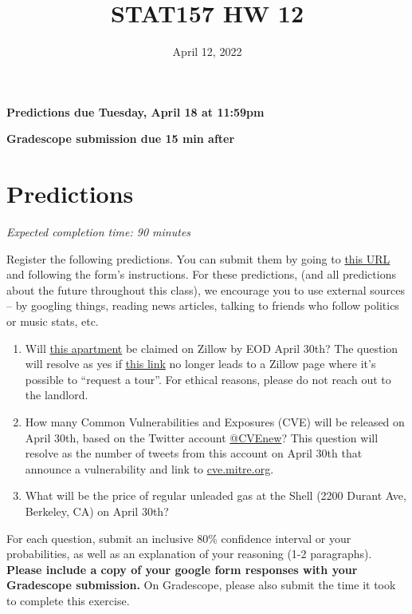 \documentclass[11pt]{article}
\title{STAT157 HW 12}
\date{April 12, 2022}
\begin{document}
\maketitle

\hfill \textbf{Predictions due Tuesday, April 18 at 11:59pm}

\hfill \textbf{Gradescope submission due 15 min after}

\section*{Predictions}

\emph{Expected completion time: 90 minutes}

Register the following predictions. You can submit them by going to \href{https://docs.google.com/forms/d/1GtTv93jJqtHLPuYAle5L9XQFdcTDxNm-hsitq9hiK4w/edit}{this URL} and following the form's instructions. For these predictions, (and all predictions about the future throughout this class), we encourage you to use external sources -- by googling things, reading news articles, talking to friends who follow politics or music stats, etc.

\begin{enumerate}
	\item Will \href{https://www.zillow.com/b/studio,-%241,850-berkeley-ca-5YCBTB/}{this apartment} be claimed on Zillow by EOD April 30th? The question will resolve as yes if \href{https://www.zillow.com/b/studio,-%241,850-berkeley-ca-5YCBTB/}{this link} no longer leads to a Zillow page where it's possible to ``request a tour''. For ethical reasons, please do not reach out to the landlord.
	\item How many Common Vulnerabilities and Exposures (CVE) will be released on April 30th, based on the Twitter account \href{https://twitter.com/CVEnew?ref_src=twsrc}{@CVEnew}? This question will resolve as the number of tweets from this account on April 30th that announce a vulnerability and link to \url{cve.mitre.org}.
	\item What will be the price of regular unleaded gas at the Shell (2200 Durant Ave, Berkeley, CA) on April 30th?
\end{enumerate}
For each question, submit an inclusive 80\% confidence interval or your probabilities, as well as an explanation of your reasoning (1-2 paragraphs).
\textbf{Please include a copy of your google form responses with your Gradescope submission.}
On Gradescope, please also submit the time it took to complete this exercise.
\end{document}
